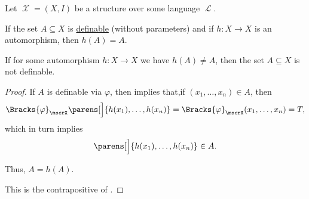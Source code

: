 \begin{corollary}\label{thm:automorphism_of_definable_set}
  Let \( \mscrX = (X, I) \) be a structure over some language \( \mscrL \).

  \begin{thmenum}
     If the set \( A \subseteq X \) is \hyperref[def:first_order_definability]{definable} (without parameters) and if \( h: X \to X \) is an automorphism, then \( h(A) = A \).

     If for some automorphism \( h: X \to X \) we have \( h(A) \neq A \), then the set \( A \subseteq X \) is not definable.
  \end{thmenum}
\end{corollary}
\begin{proof}
   If \( A \) is definable via \( \varphi \), then  implies that,if \( (x_1, \ldots, x_n) \in A \), then
  \begin{equation*}
    \Bracks{\varphi}_\mscrX\parens[\Big]{ h(x_1), \ldots, h(x_n) } = \Bracks{\varphi}_\mscrX(x_1, \ldots, x_n) = T,
  \end{equation*}
  which in turn implies
  \begin{equation*}
    \parens[\Big]{ h(x_1), \ldots, h(x_n) } \in A.
  \end{equation*}

  Thus, \( A = h(A) \).

   This is the contrapositive of .
\end{proof}
